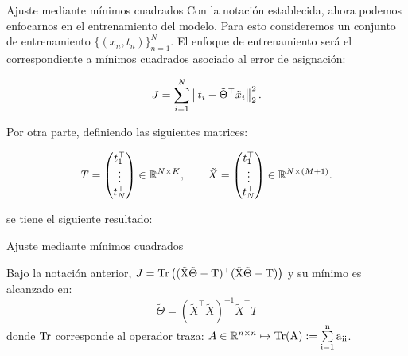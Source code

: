 \documentclass[9pt, handout]{beamer}
\begin{document}
\begin{frame}{Ajuste mediante mínimos cuadrados}
Con la notación establecida, ahora podemos enfocarnos en el entrenamiento del modelo.  Para esto consideremos un conjunto de entrenamiento $\{(x_n,t_n)\}_{n=1}^N$. El enfoque de entrenamiento será el correspondiente a mínimos cuadrados asociado al error de asignación:

\begin{equation*}
  J = \sum_{i=1}^N \left\lVert t_i - \tilde{\Theta}^\top\tilde{x}_i\right\rVert_2^2.
\end{equation*}  \pause

Por otra parte, definiendo las siguientes matrices:

\begin{equation*}
  T = \left(\begin{matrix}
    t_1^\top\\
    \vdots\\
    t_N^\top
  \end{matrix}\right)\in\mathbb{R}^{N\times K},\qquad
  \tilde{X} = \left(\begin{matrix}
    t_1^\top\\
    \vdots\\
    t_N^\top
  \end{matrix}\right)\in\mathbb{R}^{N\times (M+1)}.
\end{equation*}

\pause

se tiene el siguiente resultado:

\end{frame}

\begin{frame}{Ajuste mediante mínimos cuadrados}

\begin{lemma}
  Bajo la notación anterior, $J=\operatorfont{Tr} \left((\tX\tilde{\Theta}-T)^\top (\tX\tilde{\Theta}-T)\right)$ y su mínimo es alcanzado en: 
  \begin{equation*}
    \tilde{\Theta} = (\tilde{X}^\top\tilde{X})^{-1}\tilde{X}^\top T
  \end{equation*}
  donde $\operatorfont{Tr}$ corresponde al operador traza: $A\in\R^{n\times n}\mapsto \operatorfont{Tr}(A):=\sum\limits_{i=1}^n a_{ii}$.
\end{lemma}


\end{frame}
\end{document}
